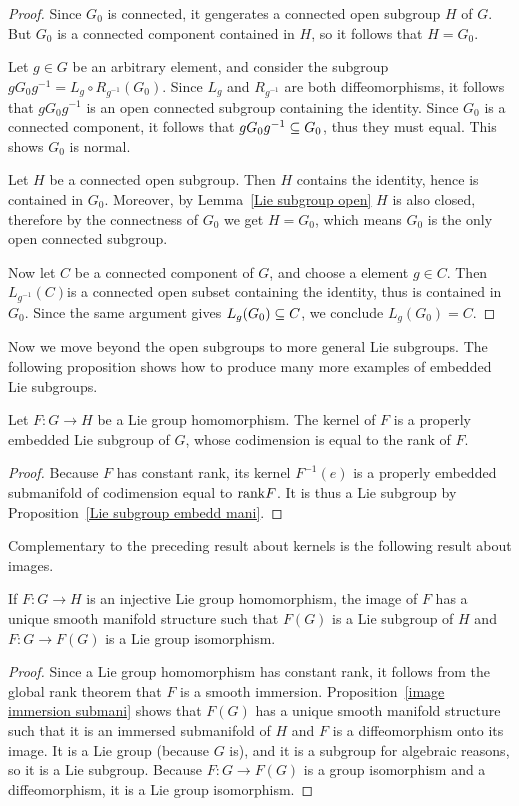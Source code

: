 \begin{proof}
Since $G_0$ is connected, it gengerates a connected open subgroup $H$ of $G$. But $G_0$ is a connected component contained in $H$, so it follows that $H=G_0$.\par 
Let $g\in G$ be an arbitrary element, and consider the subgroup $gG_0g^{-1}=L_g\circ R_{g^{-1}}(G_0)$. Since $L_g$ and $R_{g^{-1}}$ are both diffeomorphisms, it 
follows that $gG_0g^{-1}$ is an open connected subgroup containing the identity. Since $G_0$ is a connected component, it follows that $gG_0g^{-1}\subseteq G_0$, thus 
they must equal. This shows $G_0$ is normal.\par 
Let $H$ be a connected open subgroup. Then $H$ contains the identity, hence  is contained in $G_0$. Moreover, by Lemma~\ref{Lie subgroup open} $H$ is also closed, 
therefore by the connectness of $G_0$ we get $H=G_0$, which means $G_0$ is the only open connected subgroup.\par
Now let $C$ be a connected component of $G$, and choose a element $g\in C$. Then $L_{g^{-1}}(C)$is a connected open subset containing the identity, thus is contained 
in $G_0$. Since the same argument gives $L_g(G_0)\subseteq C$, we conclude $L_g(G_0)=C$.
\end{proof}
Now we move beyond the open subgroups to more general Lie subgroups. The
following proposition shows how to produce many more examples of embedded Lie
subgroups.
\begin{proposition}\label{Lie homo ker}
Let $F:G\to H$ be a Lie group homomorphism. The kernel of $F$ is a properly embedded Lie subgroup of $G$, whose codimension is equal to the rank of $F$.
\end{proposition}
\begin{proof}
Because $F$ has constant rank, its kernel $F^{-1}(e)$ is a properly embedded
submanifold of codimension equal to $\mathrm{rank} F$. It is thus a Lie subgroup by Proposition~\ref{Lie subgroup embedd mani}.
\end{proof}
Complementary to the preceding result about kernels is the following result about images.
\begin{proposition}\label{Lie homo injective}
If $F:G\to H$ is an injective Lie group homomorphism, the image of $F$ has a unique smooth manifold structure such that $F(G)$ is a Lie subgroup of $H$ and $F:G\to F(G)$ is a Lie group isomorphism.
\end{proposition}
\begin{proof}
Since a Lie group homomorphism has constant rank, it follows from the global rank theorem that $F$ is a smooth immersion. Proposition~\ref{image immersion submani} shows that $F(G)$ has a unique smooth manifold structure such that it is an immersed submanifold of $H$ and $F$ is a diffeomorphism onto its image. It is a Lie group (because $G$ is), and it is a subgroup for algebraic reasons, so it is a Lie subgroup. Because $F:G\to F(G)$ is a group isomorphism and a diffeomorphism, it is a Lie group isomorphism.
\end{proof}
